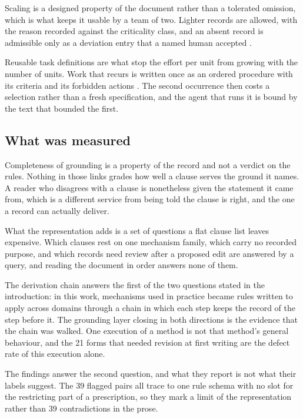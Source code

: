 Scaling is a designed property of the document rather than a tolerated omission, which is what keeps it usable by a team of two. Lighter records are allowed, with the reason recorded against the criticality class, and an absent record is admissible only as a deviation entry that a named human accepted \citep[Sections~\hyperlink{nss-1.5}{1.5} and~\hyperlink{nss-1.6}{1.6}]{pss2026}.

Reusable task definitions are what stop the effort per unit from growing with the number of units. Work that recurs is written once as an ordered procedure with its criteria and its forbidden actions \citep[Section~\hyperlink{nss-5.10}{5.10}]{pss2026}. The second occurrence then costs a selection rather than a fresh specification, and the agent that runs it is bound by the text that bounded the first.

\subsection{What was measured}

Completeness of grounding is a property of the record and not a verdict on the rules. Nothing in those links grades how well a clause serves the ground it names. A reader who disagrees with a clause is nonetheless given the statement it came from, which is a different service from being told the clause is right, and the one a record can actually deliver.

What the representation adds is a set of questions a flat clause list leaves expensive. Which clauses rest on one mechanism family, which carry no recorded purpose, and which records need review after a proposed edit are answered by a query, and reading the document in order answers none of them.

The derivation chain answers the first of the two questions stated in the introduction: in this work, mechanisms used in practice became rules written to apply across domains through a chain in which each step keeps the record of the step before it. The grounding layer closing in both directions is the evidence that the chain was walked. One execution of a method is not that method's general behaviour, and the 21 forms that needed revision at first writing are the defect rate of this execution alone.

The findings answer the second question, and what they report is not what their labels suggest. The 39 flagged pairs all trace to one rule schema with no slot for the restricting part of a prescription, so they mark a limit of the representation rather than 39 contradictions in the prose.

